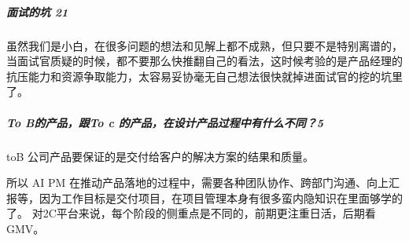 \documentclass[letterpaper,10pt,english]{sphinxmanual}
\begin{document}
\subparagraph{面试的坑 21\sphinxfootnotemark[867]}
\label{\detokenize{chapter_interview/question:id16}}%
\begin{footnotetext}[867]\sphinxAtStartFootnote
{}
%
\end{footnotetext}\ignorespaces 
虽然我们是小白，在很多问题的想法和见解上都不成熟，但只要不是特别离谱的，当面试官质疑的时候，都不要那么快推翻自己的看法，这时候考验的是产品经理的抗压能力和资源争取能力，太容易妥协毫无自己想法很快就掉进面试官的挖的坑里了。


\subparagraph{To B的产品，跟To c 的产品，在设计产品过程中有什么不同？5\sphinxfootnotemark[868]}
\label{\detokenize{chapter_interview/question:to-b-to-c-5}}%
\begin{footnotetext}[868]\sphinxAtStartFootnote
{}
%
\end{footnotetext}\ignorespaces 
toB
公司产品要保证的是交付给客户的解决方案的结果和质量。%
\begin{footnote}[869]\sphinxAtStartFootnote
{}
%
\end{footnote}所以
AI PM
在推动产品落地的过程中，需要各种团队协作、跨部门沟通、向上汇报等，因为工作目标是交付项目，在项目管理本身有很多蛮内隐知识在里面够学的了。
对2C平台来说，每个阶段的侧重点是不同的，前期更注重日活，后期看GMV。%
\begin{footnote}[870]\sphinxAtStartFootnote
{}
%
\end{footnote}
\end{document}
